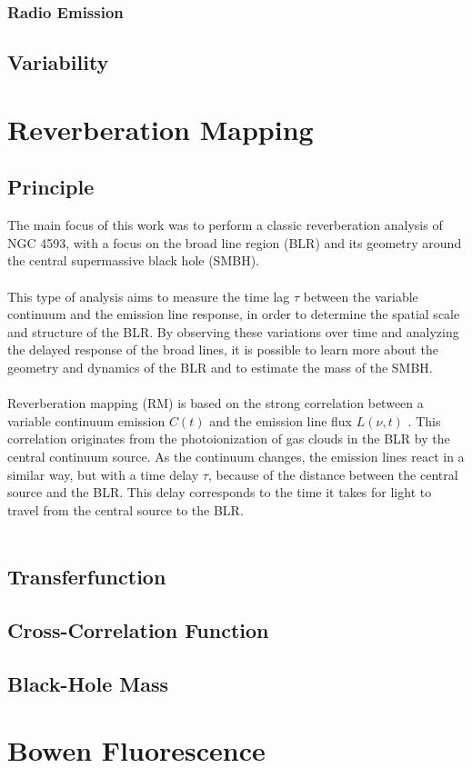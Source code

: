 \subsubsection{Radio Emission}




\subsection{Variability}
\label{sec:variability}

\section{Reverberation Mapping}
\label{sec:reverberation_mapping}


\subsection{Principle}
\label{subsec:rm_principle}



The main focus of this work was to perform a classic reverberation analysis of NGC 4593, with a focus on the broad line region (BLR) and its geometry around the central supermassive black hole (SMBH).\\\\
This type of analysis aims to measure the time lag $\tau$ between the variable continuum and the emission line response, in order to determine the spatial scale and structure of the BLR. By observing these variations over time and analyzing the delayed response of the broad lines, it is possible to learn more about the geometry and dynamics of the BLR and to estimate the mass of the SMBH.\\\\
Reverberation mapping (RM) is based on the strong correlation between a variable continuum emission $C(t)$ and the emission line flux $L(\nu, t)$ \parencite{horne2021space}. This correlation originates from the photoionization of gas clouds in the BLR by the central continuum source. As the continuum changes, the emission lines react in a similar way, but with a time delay $\tau$, because of the distance between the central source and the BLR. This delay corresponds to the time it takes for light to travel from the central source to the BLR.\\\\

\subsection{Transferfunction}
\label{subsec:rm_transferfunction}

\subsection{Cross-Correlation Function}
\label{subsec:rm_ccf}

\subsection{Black-Hole Mass}
\label{subsec:rm_bh_mass}

\section{Bowen Fluorescence}
\label{sec:bowen_fluorescence}